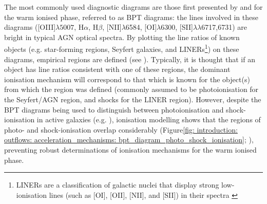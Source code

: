 The most commonly used diagnostic diagrams are those first presented by \citet{Baldwin1981} and \citet{Veilleux1987} for the warm ionised phase, referred to as BPT diagrams: the lines involved in these diagrams ([OIII]$\lambda5007$, H$\alpha$, H$\beta$, [NII]$\lambda$6584, [OI]$\lambda$6300, [SII]$\lambda\lambda$6717,6731) are bright in typical AGN optical spectra. By plotting the line ratios of known objects (e.g. star-forming regions, Seyfert galaxies, and LINERs\footnote{LINERs are a classification of galactic nuclei that display strong low-ionisation lines (such as [OI], [OII], [NII], and [SII]) in their spectra \citep{Heckman1980}}) on these diagrams, empirical regions are defined (see \citealt{Kewley2006}). Typically, it is thought that if an object has line ratios consistent with one of these regions, the dominant ionisation mechanism will correspond to that which is known for the object(s) from which the region was defined (commonly assumed to be photoionisation for the Seyfert/AGN region, and shocks for the LINER region). However, despite the BPT diagrams being used to distinguish between photoionisation and shock-ionisation in active galaxies (e.g. \citealt{Mingozzi2019, Venturi2021, Venturi2023, Revalski2021}), ionisation modelling shows that the regions of photo- and shock-ionisation overlap considerably (Figure\;\ref{fig: introduction: outflows: acceleration_mechanisms: bpt_diagram_photo_shock_ionisation}; \citealt{Dopita1995, Dopita1996, Allen2008, Ji2020}), preventing robust determinations of ionisation mechanisms for the warm ionised phase. 

